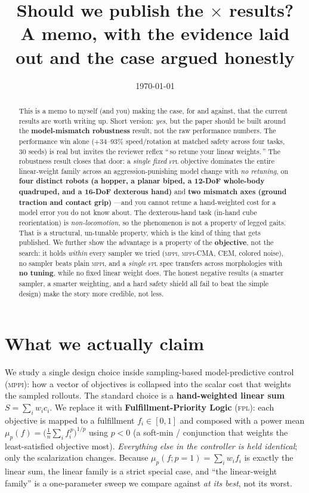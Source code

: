 \documentclass[11pt]{article}
\title{\vspace{-2em}Should we publish the \fpl$\times$\mppi{} results?\\
\large A memo, with the evidence laid out and the case argued honestly}
\author{}
\date{\today}
\newcommand{\fpl}{\textsc{fpl}}
\newcommand{\mppi}{\textsc{mppi}}
\begin{document}
\maketitle
\vspace{-2.5em}

\begin{abstract}
\noindent This is a memo to myself (and you) making the case, for and against, that the
current results are worth writing up. Short version: \emph{yes}, but the paper should be
built around the \textbf{model-mismatch robustness} result, not the raw performance numbers.
The performance win alone ($+$34--93\% speed/rotation at matched safety across four tasks,
30 seeds) is real but invites the reviewer reflex ``\,so retune your linear weights.\,'' The robustness
result closes that door: a \emph{single fixed} \fpl{} objective dominates the entire
linear-weight family across an aggression-punishing model change with \emph{no retuning}, on
\textbf{four distinct robots (a hopper, a planar biped, a 12-DoF whole-body quadruped, and a
16-DoF dexterous hand)} and \textbf{two mismatch axes (ground traction and contact grip)}
---and you cannot retune a hand-weighted cost for a model error you do not know about. The
dexterous-hand task (in-hand cube reorientation) is \emph{non-locomotion}, so the phenomenon is
not a property of legged gaits. That is a structural, un-tunable property, which is the kind of
thing that gets published. We further show the advantage is a property of the \textbf{objective},
not the search: it holds \emph{within} every sampler we tried (\mppi, \mppi-CMA, CEM, colored
noise), no sampler beats plain \mppi, and a \emph{single} \fpl{} spec transfers across morphologies
with \textbf{no tuning}, while no fixed linear weight does. The honest negative results (a smarter
sampler, a smarter weighting, and a hard safety shield all fail to beat the simple design) make the
story more credible, not less.
\end{abstract}

\section{What we actually claim}

We study a single design choice inside sampling-based model-predictive control (\mppi):
how a vector of objectives is collapsed into the scalar cost that weights the sampled
rollouts. The standard choice is a \textbf{hand-weighted linear sum}
$S = \sum_i w_i c_i$. We replace it with \textbf{Fulfillment-Priority Logic} (\fpl):
each objective is mapped to a fulfillment $f_i\in[0,1]$ and composed with a
power mean $\mu_p(f)=\big(\tfrac1n\sum_i f_i^{\,p}\big)^{1/p}$ using $p<0$
(a soft-min / conjunction that weights the least-satisfied objective most).
\emph{Everything else in the controller is held identical}; only the scalarization changes.
Because $\mu_p(f;p{=}1)=\sum_i w_i f_i$ is exactly the linear sum, the linear family is a
strict special case, and ``the linear-weight family'' is a one-parameter sweep we compare
against \emph{at its best}, not its worst.
\end{document}
